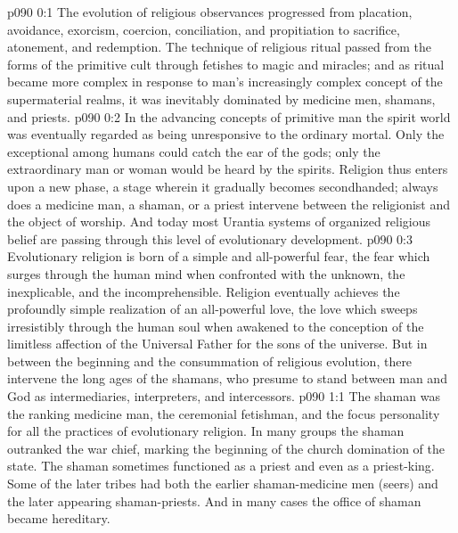 \author{Melchizedek}
\vs p090 0:1 The evolution of religious observances progressed from placation, avoidance, exorcism, coercion, conciliation, and propitiation to sacrifice, atonement, and redemption. The technique of religious ritual passed from the forms of the primitive cult through fetishes to magic and miracles; and as ritual became more complex in response to man’s increasingly complex concept of the supermaterial realms, it was inevitably dominated by medicine men, shamans, and priests.
\vs p090 0:2 In the advancing concepts of primitive man the spirit world was eventually regarded as being unresponsive to the ordinary mortal. Only the exceptional among humans could catch the ear of the gods; only the extraordinary man or woman would be heard by the spirits. Religion thus enters upon a new phase, a stage wherein it gradually becomes secondhanded; always does a medicine man, a shaman, or a priest intervene between the religionist and the object of worship. And today most Urantia systems of organized religious belief are passing through this level of evolutionary development.
\vs p090 0:3 Evolutionary religion is born of a simple and all\hyp{}powerful fear, the fear which surges through the human mind when confronted with the unknown, the inexplicable, and the incomprehensible. Religion eventually achieves the profoundly simple realization of an all\hyp{}powerful love, the love which sweeps irresistibly through the human soul when awakened to the conception of the limitless affection of the Universal Father for the sons of the universe. But in between the beginning and the consummation of religious evolution, there intervene the long ages of the shamans, who presume to stand between man and God as intermediaries, interpreters, and intercessors.
\vs p090 1:1 The shaman was the ranking medicine man, the ceremonial fetishman, and the focus personality for all the practices of evolutionary religion. In many groups the shaman outranked the war chief, marking the beginning of the church domination of the state. The shaman sometimes functioned as a priest and even as a priest\hyp{}king. Some of the later tribes had both the earlier shaman\hyp{}medicine men (seers) and the later appearing shaman\hyp{}priests. And in many cases the office of shaman became hereditary.
